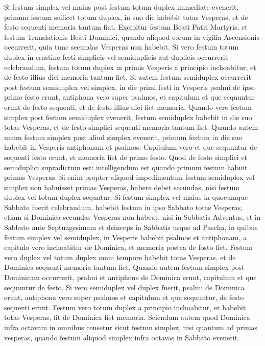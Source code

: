 \begin{multicols*}{2}
{\color{Red} }
\lettrine[lines=2]{\zallmancaps \color{Blue} S}{i} festum simplex vel maius post festum totum duplex immediate evenerit, primum festum scilicet totum duplex, in suo die habebit totas Vesperas, et de festo sequenti memoria tantum fiat.
Excipitur festum Beati Patri Martyris, et festum Translationis Beati Dominici, quando aliquod eorum in vigilia Ascensionis occurrerit, quia tunc secundas Vesperas non habebit.
Si vero festum totum duplex in crastino festi simplicis vel semiduplicis aut duplicis occurrerit celebrandum, festum totum duplex in primis Vesperis a principio inchoabitur, et de festo illius diei memoria tantum fiet.
Si autem festum semiduplex occurrerit post festum semiduplex vel simplex, in die primi festi in Vesperis psalmi de ipso primo festo erunt, antiphona vero super psalmos, et capitulum et que sequuntur erunt de festo sequenti, et de festo illius diei fiet memoria.
Quando vero festum simplex post festum semiduplex evenerit, festum semiduplex habebit in die suo totas Vesperas, et de festo simplici sequenti memoria tantum fiet.
Quando autem unum festum simplex post aliud simplex evenerit, primum festum in die suo habebit in Vesperis antiphonam et psalmos. Capitulum vero et que sequuntur de sequenti festo erunt, et memoria fiet de primo festo. Quod de festo simplici et semiduplici supradictum est: intelligendum est quando primum festum habuit primas Vesperas. Si enim propter aliquod impedimentum festum semiduplex vel simplex non habuisset primas Vesperas, habere debet secundas, nisi festum duplex vel totum duplex sequatur.
Si festum simplex vel maius in quocumque Sabbato fuerit celebrandum, habebit festum in ipso Sabbato totas Vesperas, etiam si Dominica secundas Vesperas non habeat, nisi in Sabbatis Adventus, et in Sabbato ante Septuagesimam et deinceps in Sabbatis usque ad Pascha, in quibus festum simplex vel semiduplex, in Vesperis habebit psalmos et antiphonam, a capitulo vero inchoabitur de Dominica, et memoria postea de fosto fiet. Festum vero duplex vel totum duplex omni tempore habebit totas Vesperas, et de Dominica sequenti memoria tantum fiet.
Quando autem festum simplex post Dominicam occurrerit, psalmi et antiphone de Dominica erunt, capitulum et que sequuntur de festo. Si vero semiduplex vel duplex fuerit, psalmi de Dominica erunt, antiphona vero super psalmos et capitulum et que sequuntur, de festo sequenti erunt. Festum vero totum duplex a principio inchoabitur, et habebit totas Vesperas, fit de Dominica fiet memoria.
Sciendum autem quod Dominica infra octavam in omnibus censetur sicut festum simplex, nisi quantum ad primas vesperas, quando festum aliquod simplex infra octavas in Sabbato evenerit.


\end{multicols*}
